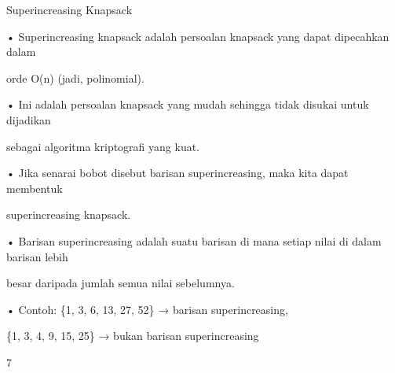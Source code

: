 \documentclass{article}
\begin{document}

Superincreasing Knapsack

• Superincreasing knapsack adalah persoalan knapsack yang dapat dipecahkan dalam 

orde O(n) (jadi, polinomial). 

• Ini adalah persoalan knapsack yang mudah sehingga tidak disukai untuk dijadikan 

sebagai algoritma kriptografi yang kuat.

• Jika senarai bobot disebut barisan superincreasing, maka kita dapat membentuk 

superincreasing knapsack. 

• Barisan superincreasing adalah suatu barisan di mana setiap nilai  di dalam barisan lebih 

besar daripada jumlah semua nilai  sebelumnya. 

• Contoh:   \{1, 3, 6, 13, 27, 52\}  → barisan superincreasing, 

    \{1, 3, 4, 9, 15, 25\}     →  bukan barisan superincreasing

7
\end{document}
